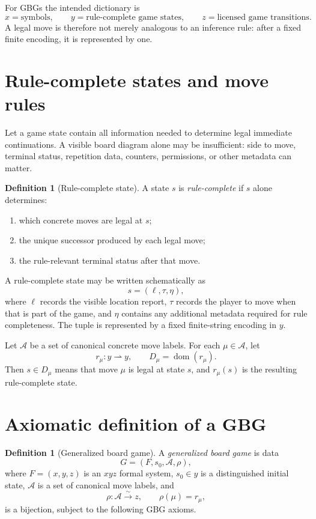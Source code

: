 \documentclass[11pt]{article}
\theoremstyle{definition}
\newtheorem{definition}[theorem]{Definition}
\theoremstyle{remark}
\begin{document}
For GBGs the intended dictionary is
\[
\boxed{x=\text{symbols}},\qquad
\boxed{y=\text{rule-complete game states}},\qquad
\boxed{z=\text{licensed game transitions}}.
\]
A legal move is therefore not merely analogous to an inference rule: after a fixed finite encoding, it is represented by one.

\section{Rule-complete states and move rules}

Let a game state contain all information needed to determine legal immediate continuations.  A visible board diagram alone may be insufficient: side to move, terminal status, repetition data, counters, permissions, or other metadata can matter.

\begin{definition}[Rule-complete state]
A state $s$ is \emph{rule-complete} if $s$ alone determines:
\begin{enumerate}[label=(\roman*),leftmargin=1.7em]
\item which concrete moves are legal at $s$;
\item the unique successor produced by each legal move;
\item the rule-relevant terminal status after that move.
\end{enumerate}
\end{definition}

A rule-complete state may be written schematically as
\[
s=(\ell,\tau,\eta),
\]
where $\ell$ records the visible location report, $\tau$ records the player to move when that is part of the game, and $\eta$ contains any additional metadata required for rule completeness.  The tuple is represented by a fixed finite-string encoding in $y$.

Let $\mathcal A$ be a set of canonical concrete move labels.  For each $\mu\in\mathcal A$, let
\[
r_\mu:y\rightharpoonup y,
\qquad
D_\mu=\operatorname{dom}(r_\mu).
\]
Then $s\in D_\mu$ means that move $\mu$ is legal at state $s$, and $r_\mu(s)$ is the resulting rule-complete state.

\section{Axiomatic definition of a GBG}

\begin{definition}[Generalized board game]
A \emph{generalized board game} is data
\[
G=(F,s_0,\mathcal A,\rho),
\]
where $F=(x,y,z)$ is an $xyz$ formal system, $s_0\in y$ is a distinguished initial state, $\mathcal A$ is a set of canonical move labels, and
\[
\rho:\mathcal A\xrightarrow{\sim}z,
\qquad \rho(\mu)=r_\mu,
\]
is a bijection, subject to the following GBG axioms.
\end{definition}
\end{document}
